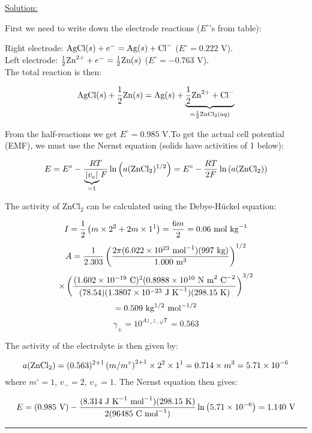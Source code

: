 \noindent
\underline{Solution:}

First we need to write down the electrode reactions ($E^\circ$'s from table):

Right electrode: $\textnormal{AgCl}(s) + e^- = \textnormal{Ag}(s) + \textnormal{Cl}^-$ ($E^\circ = 0.222$ V).\\
Left electrode: $\frac{1}{2}\textnormal{Zn}^{2+} + e^- = \frac{1}{2}\textnormal{Zn}(s)$ ($E^\circ = -0.763$ V).\\

The total reaction is then:

$$\textnormal{AgCl}(s) + \frac{1}{2}\textnormal{Zn}(s) = \textnormal{Ag}(s) + \mathop {\underbrace{\frac{1}{2}\textnormal{Zn}^{2+} + \textnormal{Cl}^-}}\limits_{=\frac{1}{2}\textnormal{ZnCl}_2(aq)}$$

From the half-reactions we get $E^\circ = 0.985$ V.To get the actual cell potential (EMF), we must use the Nernst equation (solids have activities of 1 below):

$$E = E^\circ - \frac{RT}{\mathop {\underbrace{\left|v_e\right|}}\limits_{=1}F}\ln\left(a(\textnormal{ZnCl}_2)^{1/2}\right) = E^\circ - \frac{RT}{2F}\ln\left(a(\textnormal{ZnCl}_2)\right)$$

The activity of ZnCl$_2$ can be calculated using the Debye-H\"uckel equation:

$$I = \frac{1}{2}\left(m\times 2^2 + 2m\times 1^1\right) = \frac{6m}{2} = 0.06\textnormal{ mol kg}^{-1}$$
$$A = \frac{1}{2.303}\left(\frac{2\pi(6.022\times 10^{23}\textnormal{ mol}^{-1})(997\textnormal{ kg})}{1.000\textnormal{ m}^3}\right)^{1/2}$$
$$\times\left(\frac{(1.602\times 10^{-19}\textnormal{ C})^2(0.8988\times 10^{10}\textnormal{ N m}^2\textnormal{ C}^{-2}}{(78.54)(1.3807\times 10^{-23}\textnormal{ J K}^{-1})(298.15\textnormal{ K})}\right)^{3/2}$$
$$ = 0.509\textnormal{ kg}^{1/2}\textnormal{ mol}^{-1/2}$$
$$\gamma_\pm = 10^{Az_+z_-\sqrt{I}} = 0.563$$

The activity of the electrolyte is then given by:

$$a(\textnormal{ZnCl}_2) = (0.563)^{2+1}\left(m/m^\circ\right)^{2+1}\times 2^2\times 1^1 = 0.714\times m^3 = 5.71\times 10^{-6}$$
where $m^\circ = 1$, $v_- = 2$, $v_+ = 1$. The Nernst equation then gives:

$$E = (0.985\textnormal{ V}) - \frac{(8.314\textnormal{ J K}^{-1}\textnormal{ mol}^{-1})(298.15\textnormal{ K})}{2(96485\textnormal{ C mol}^{-1})}\ln\left(5.71\times 10^{-6}\right) = 1.140\textnormal{ V}$$

\hrule\vspace{0.5cm}
